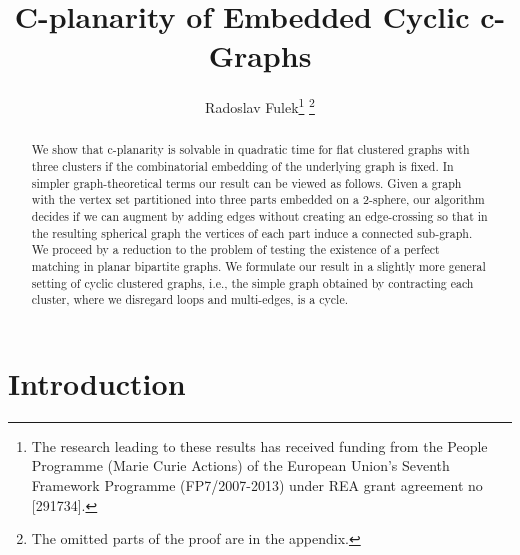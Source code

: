 \documentclass{llncs}
\def\inst#1{}
\newif\iflong
\begin{document}
\title{C-planarity of Embedded Cyclic c-Graphs}

\author{Radoslav Fulek\inst{1}\thanks{The research leading to these results has received funding from the People Programme (Marie Curie Actions) of the European Union's Seventh Framework Programme (FP7/2007-2013) under REA grant agreement no [291734].}
\iflong\else\thanks{The omitted parts of the proof are in the appendix.}\fi}


\maketitle



\begin{abstract}
We show that c-planarity is solvable in quadratic time for 
flat clustered graphs with three clusters if the combinatorial embedding
of the underlying  graph is fixed. In simpler graph-theoretical terms our result can be viewed as follows. Given a graph  with the vertex set  partitioned into three parts embedded on a 2-sphere, our algorithm decides if we can augment  by adding edges 
without creating an edge-crossing so that in the resulting spherical graph the vertices of each part induce a  connected sub-graph.
We proceed by a reduction to the problem of testing the existence of  a perfect matching in planar
bipartite graphs.
We formulate our result in a slightly more general setting of cyclic clustered graphs,
i.e., the simple graph  obtained by contracting each cluster, where we disregard loops and multi-edges, is a cycle. 
\end{abstract}






\setcounter{page}{1}
\section{Introduction}
\end{document}
